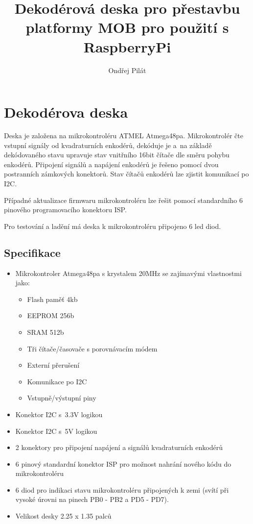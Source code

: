 \documentclass[a4paper,11pt]{article}
\author{Ondřej Pilát}
\title{Dekodérová deska pro přestavbu platformy MOB pro použití s RaspberryPi}
\begin{document}
\maketitle
\newpage
\tableofcontents
\newpage
\section{Dekodérova deska}
Deska je založena na mikrokontroléru ATMEL Atmega48pa. Mikrokontrolér čte vstupní signály od kvadraturních enkodérů, dekóduje je a~na základě dekódovaného stavu upravuje stav vnitřního 16bit čítače dle směru pohybu enkodérů. 
Připojení signálů a napájení enkodérů je řešeno pomocí dvou postranních zámkových konektorů. Stav čítačů enkodérů lze zjistit komunikací po I2C. 

Případné aktualizace firmwaru mikrokontroléru lze řešit pomocí standardního 6 pinového programovacího konektoru ISP.

Pro testování a ladění má deska k mikrokontroléru připojeno 6 led diod. 

\subsection{Specifikace}
\begin{itemize}
	\item Mikrokontroler Atmega48pa s krystalem 20MHz se zajímavými vlastnostmi jako:
		\begin{itemize}
			\item Flash paměť 4kb
			\item EEPROM 256b
			\item SRAM 512b  
			\item Tři čítače/časovače s porovnávacím módem
			\item Externí přerušení
			\item Komunikace po I2C
			\item Vstupně/výstupní piny
		\end{itemize}
	\item Konektor I2C s~3.3V logikou
	\item Konektor I2C s~5V logikou
	\item 2 konektory pro připojení napájení a signálů kvadraturních enkodérů
	\item 6 pinový standardní konektor ISP pro možnost nahrání nového kódu do mikrokontroléru
	\item 6 diod pro indikaci stavu mikrokontroléru připojených k zemi 
	(svítí při vysoké úrovni na pinech PB0 - PB2 a PD5 - PD7).
	\item Velikost desky 2.25 x 1.35 palců
\end{itemize}
\end{document}
